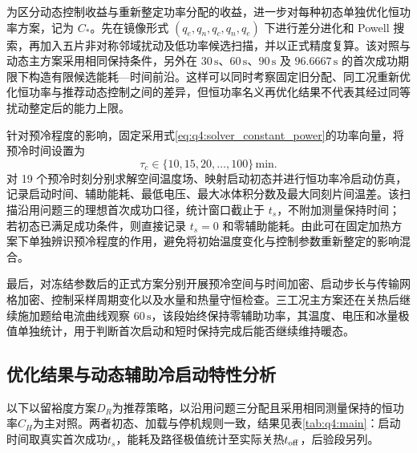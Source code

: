 \documentclass[bwprint]{gmcmthesis}
\numberwithin{equation}{section}
\numberwithin{figure}{section}
\begin{document}
为区分动态控制收益与重新整定功率分配的收益，进一步对每种初态单独优化恒功率方案，记为 \(C_*\)。先在镜像形式 \((q_e,q_n,q_c,q_n,q_e)\) 下进行差分进化和 Powell 搜索，再加入五片非对称邻域扰动及低功率候选扫描，并以正式精度复算。该对照与动态主方案采用相同保持条件，另外在 \(30\,\mathrm s\)、\(60\,\mathrm s\)、\(90\,\mathrm s\) 及 \(96.6667\,\mathrm s\) 的首次成功期限下构造有限候选能耗—时间前沿。这样可以同时考察固定旧分配、同工况重新优化恒功率与推荐动态控制之间的差异，但恒功率名义再优化结果不代表其经过同等扰动整定后的能力上限。

针对预冷程度的影响，固定采用式\eqref{eq:q4:solver_constant_power}的功率向量，将预冷时间设置为
\begin{equation}
\tau_c\in\{10,15,20,\ldots,100\}\,\mathrm{min}.
\label{eq:q4:solver_cooling_scan}
\end{equation}
对 19 个预冷时刻分别求解空间温度场、映射启动初态并进行恒功率冷启动仿真，记录启动时间、辅助能耗、最低电压、最大冰体积分数及最大同刻片间温差。该扫描沿用问题三的理想首次成功口径，统计窗口截止于 \(t_s\)，不附加测量保持时间；若初态已满足成功条件，则直接记录 \(t_s=0\) 和零辅助能耗。由此可在固定加热方案下单独辨识预冷程度的作用，避免将初始温度变化与控制参数重新整定的影响混合。

最后，对冻结参数后的正式方案分别开展预冷空间与时间加密、启动步长与传输网格加密、控制采样周期变化以及水量和热量守恒检查。三工况主方案还在关热后继续施加题给电流曲线观察 \(60\,\mathrm s\)，该段始终保持零辅助功率，其温度、电压和冰量极值单独统计，用于判断首次启动和短时保持完成后能否继续维持暖态。

\subsection{优化结果与动态辅助冷启动特性分析}
\label{sec:q4:results}

以下以留裕度方案\(D_R\)为推荐策略，以沿用问题三分配且采用相同测量保持的恒功率\(C_H\)为主对照。两者初态、加载与停机规则一致，结果见表\ref{tab:q4:main}：启动时间取真实首次成功\(t_s\)，能耗及路径极值统计至实际关热\(t_{\rm off}\)，后验段另列。
\end{document}
